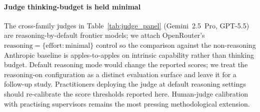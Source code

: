 \paragraph{Judge thinking-budget is held minimal} The cross-family judges in Table~\ref{tab:judge_panel} (Gemini~2.5~Pro, GPT-5.5) are reasoning-by-default frontier models; we attach OpenRouter's $\mathrm{reasoning}\!=\!\{\mathrm{effort:minimal}\}$ control so the comparison against the non-reasoning Anthropic baseline is apples-to-apples on intrinsic capability rather than thinking budget. Default reasoning mode would change the reported scores; we treat the reasoning-on configuration as a distinct evaluation surface and leave it for a follow-up study. Practitioners deploying the judge at default reasoning settings should re-calibrate the score thresholds reported here. Human-judge calibration with practising supervisors remains the most pressing methodological extension.
